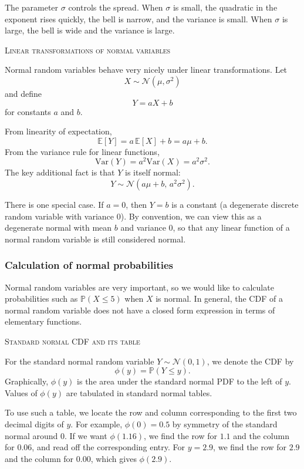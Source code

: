 The parameter \(\sigma\) controls the spread.  
When \(\sigma\) is small, the quadratic in the exponent rises quickly, the bell is narrow, and the variance is small.  
When \(\sigma\) is large, the bell is wide and the variance is large.

\bigskip\textsc{Linear transformations of normal variables}

Normal random variables behave very nicely under linear transformations.  
Let
\[
X \sim \mathcal{N}(\mu,\sigma^2)
\]
and define
\[
Y = aX + b
\]
for constants \(a\) and \(b\).  

From linearity of expectation,
\[
\mathbb{E}[Y] = a\,\mathbb{E}[X] + b = a\mu + b.
\]
From the variance rule for linear functions,
\[
\mathrm{Var}(Y) = a^2 \mathrm{Var}(X) = a^2 \sigma^2.
\]
The key additional fact is that \(Y\) is itself normal:
\[
Y \sim \mathcal{N}(a\mu + b,\, a^2\sigma^2).
\]

There is one special case.  
If \(a = 0\), then \(Y = b\) is a constant (a degenerate discrete random variable with variance \(0\)).  
By convention, we can view this as a degenerate normal with mean \(b\) and variance \(0\), so that any linear function of a normal random variable is still considered normal.


\subsubsection{Calculation of normal probabilities}

Normal random variables are very important, so we would like to calculate probabilities such as \(\mathbb{P}(X \le 5)\) when \(X\) is normal.  
In general, the CDF of a normal random variable does not have a closed form expression in terms of elementary functions.  

\bigskip\textsc{Standard normal CDF and its table}

For the standard normal random variable \(Y \sim \mathcal{N}(0,1)\), we denote the CDF by
\[
\phi(y) = \mathbb{P}(Y \le y).
\]
Graphically, \(\phi(y)\) is the area under the standard normal PDF to the left of \(y\).  
Values of \(\phi(y)\) are tabulated in standard normal tables.

To use such a table, we locate the row and column corresponding to the first two decimal digits of \(y\).  
For example, \(\phi(0) = 0.5\) by symmetry of the standard normal around \(0\).  
If we want \(\phi(1.16)\), we find the row for \(1.1\) and the column for \(0.06\), and read off the corresponding entry.  
For \(y = 2.9\), we find the row for \(2.9\) and the column for \(0.00\), which gives \(\phi(2.9)\).  


